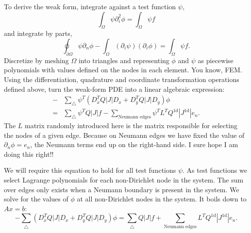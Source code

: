 To derive the weak form, integrate against a test function $\psi$,
%
\begin{equation}
\int_\Omega \psi \partial_i^2 \phi = \int_\Omega \psi f
\end{equation}
%
and integrate by parts,
%
\begin{equation}
\oint_{\partial \Omega} \psi \partial_n \phi - \int_\Omega (\partial_i \psi)(\partial_i \phi) = \int_\Omega \psi f.
\end{equation}
%
Discretize by meshing $\Omega$ into triangles and representing $\phi$ and $\psi$ as piecewise polynomials with values defined on the nodes in each element.  You know, FEM.  Using the differentiation, quadrature and coordinate transformation operations defined above, turn the weak-form PDE into a linear algebraic expression:
%
\begin{equation}
\begin{aligned}
- &\sum_\bigtriangleup \psi^T \left(D_x^T Q |J| D_x + D_y^T Q |J| D_y \right) \phi \\
= &\sum_\bigtriangleup \psi^T Q |J| f - \sum_\textrm{Neumann edges} \psi^T L^T Q^\textrm{1d} |J^\textrm{1d}|e_n.
\end{aligned}
\end{equation}
%
The $L$ matrix randomly introduced here is the matrix responsible for selecting the nodes of a given edge.  Because on Neumann edges we have fixed the value of $\partial_n \phi = e_n$, the Neumann terms end up on the right-hand side.  I sure hope I am doing this right!!

We will require this equation to hold for all test functions $\psi$.  As test functions we select Lagrange polynomials for each non-Dirichlet node in the system.  The sum over edges only exists when a Neumann boundary is present in the system.  We solve for the values of $\phi$ at all non-Dirichlet nodes in the system.  It boils down to $Ax = b$:
%
\begin{equation}
- \sum_\bigtriangleup (D_x^T Q |J| D_x + D_y^T Q |J| D_y)
\phi
=
\sum_\bigtriangleup Q |J| f + \sum_\textrm{Neumann edges} L^T Q^\textrm{1d} |J^\textrm{1d}|e_n.
\end{equation}
